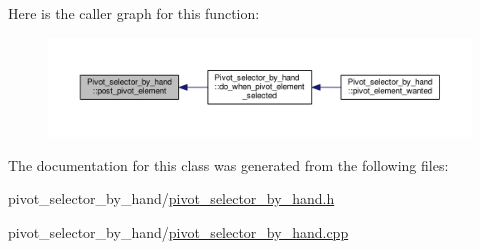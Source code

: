 Here is the caller graph for this function\+:\nopagebreak
\begin{figure}[H]
\begin{center}
\leavevmode
\includegraphics[width=350pt]{classPivot__selector__by__hand_a4ea3619df38bf9d93fc0d263d4b12cdc_icgraph}
\end{center}
\end{figure}


The documentation for this class was generated from the following files\+:\begin{DoxyCompactItemize}
\item 
pivot\+\_\+selector\+\_\+by\+\_\+hand/\hyperlink{pivot__selector__by__hand_8h}{pivot\+\_\+selector\+\_\+by\+\_\+hand.\+h}\item 
pivot\+\_\+selector\+\_\+by\+\_\+hand/\hyperlink{pivot__selector__by__hand_8cpp}{pivot\+\_\+selector\+\_\+by\+\_\+hand.\+cpp}\end{DoxyCompactItemize}
